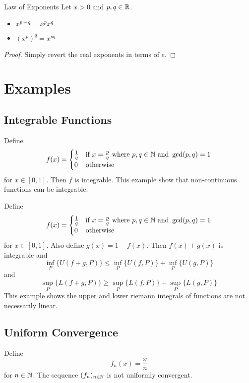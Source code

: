 \documentclass[a4paper]{article}
\begin{document}
\begin{thm}{Law of Exponents}{} Let $x>0$ and $p,q\in\mathbb{R}$. 
\begin{itemize}
\item $x^{p+q}=x^px^q$
\item $(x^p)^q=x^{pq}$
\end{itemize}\tcbline
\begin{proof} Simply revert the real exponents in terms of $e$. 
\end{proof}
\end{thm}

\pagebreak
\section{Examples}
\subsection{Integrable Functions}
\begin{eg}{}{} Define $$f(x)=\begin{cases}
\frac{1}{q} & \text{if } x=\frac{p}{q} \text{ where } p,q\in\mathbb{N} \text{ and } \gcd(p,q)=1\\
0 & \text{otherwise }
\end{cases}$$ for $x\in[0,1]$. Then $f$ is integrable. This example show that non-continuous functions can be integrable. 
\end{eg}

\begin{eg}{}{} Define $$f(x)=\begin{cases}
\frac{1}{q} & \text{if } x=\frac{p}{q} \text{ where } p,q\in\mathbb{N} \text{ and } \gcd(p,q)=1\\
0 & \text{otherwise }
\end{cases}$$ for $x\in[0,1]$. Also define $g(x)=1-f(x)$.  Then $f(x)+g(x)$ is integrable and $$\inf_{P}\{U(f+g,P)\}\leq\inf_{P}\{U(f,P)\}+\inf_{P}\{U(g,P)\}$$ and $$\sup_{P}\{L(f+g,P)\}\geq\sup_{P}\{L(f,P)\}+\sup_{P}\{L(g,P)\}$$ This example shows the upper and lower riemann integrals of functions are not necessarily linear. 
\end{eg}

\subsection{Uniform Convergence}
\begin{eg}{}{} Define $$f_n(x)=\frac{x}{n}$$ for $n\in\mathbb{N}$. The sequence $(f_n)_{n\in\mathbb{N}}$ is not uniformly convergent. 
\end{eg}
\end{document}
